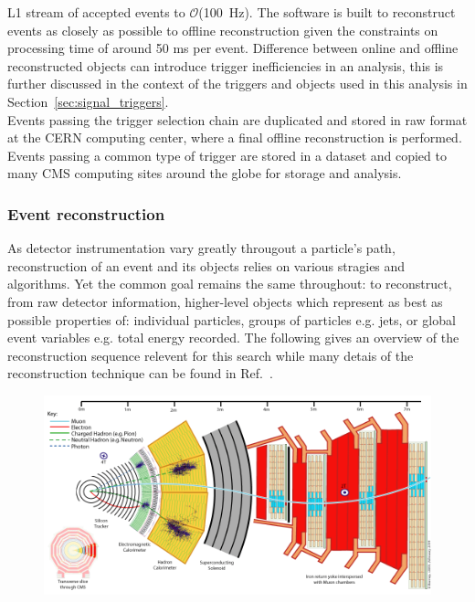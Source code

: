 L1 stream of accepted events to $\mathcal{O}$(100~Hz). The software is built to reconstruct
events as closely as possible to offline reconstruction given the constraints on processing time
of around 50 ms per event. Difference between online and offline reconstructed objects can 
introduce trigger inefficiencies in an analysis, this is further discussed in the 
context of the triggers and objects used in this analysis in Section~\ref{sec:signal_triggers}.\\
\indent Events passing the trigger selection chain are duplicated and stored in raw format at
the CERN computing center, where a final offline reconstruction is performed. Events passing
a common type of trigger are stored in a dataset and copied to many CMS computing sites around the
globe for storage and analysis. 
  
\subsubsection{Event reconstruction\label{sec:eventReco}}

As detector instrumentation vary greatly througout a particle's path, reconstruction
of an event and its objects relies on various stragies and algorithms. Yet the common goal 
remains the same throughout: to reconstruct, from raw detector information,
higher-level objects which represent as best as possible properties of: individual
particles, groups of particles e.g. jets, or global event variables e.g. total energy
recorded. The following gives an overview of the reconstruction sequence relevent for this search
while many detais of the reconstruction technique can be found in Ref.~\cite{Bayatian:922757,Bayatian:942733}. 

\begin{figure}[h!]
  \begin{center}
      \includegraphics[width=.9\textwidth,]{figures/CMS_Slice}
      \caption{\label{fig:cmdSlice} }
  \end{center}
\end{figure}

